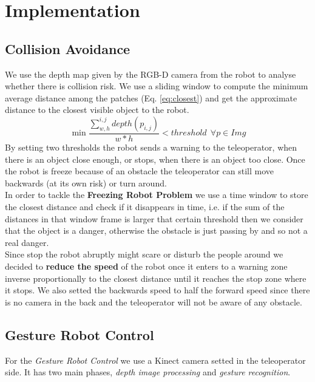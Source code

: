 \section{Implementation}
\label{sec:implementation}

\subsection{Collision Avoidance}
We use the depth map given by the RGB-D camera from the robot to analyse whether there is collision risk. We use a sliding window to compute the minimum average distance among the patches (Eq. \ref{eq:closest}) and get the approximate distance to the closest visible object to the robot. 
\begin{equation}\label{eq:closest}
\min\frac{\sum_{w,h}^{i,j}depth(p_{i,j})}{w*h} < threshold\ \ \forall p \in Img
\end{equation}
By setting two thresholds the robot sends a warning to the teleoperator, when there is an object close enough, or stops, when there is an object too close. Once the robot is freeze because of an obstacle the teleoperator can still move backwards (at its own risk) or turn around. \\

In order to tackle the \textbf{Freezing Robot Problem} we use a time window to store the closest distance and check if it disappears in time, i.e. if the sum of the distances in that window frame is larger that certain threshold then we consider that the object is a danger, otherwise the obstacle is just passing by and so not a real danger.\\

Since stop the robot abruptly might scare or disturb the people around we decided to \textbf{reduce the speed} of the robot once it enters to a warning zone inverse proportionally to the closest distance until it reaches the stop zone where it stops. We also setted the backwards speed to half the forward speed since there is no camera in the back and the teleoperator will not be aware of any obstacle. 

\subsection{Gesture Robot Control}
For the \emph{Gesture Robot Control} we use a Kinect camera setted in the teleoperator side. It has two main phases, \emph{depth image processing} and \emph{gesture recognition}.\\

